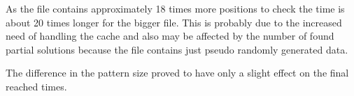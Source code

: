 As the file contains approximately 18 times more positions to check the time is about 20 times longer for the bigger file. This is probably due to the increased need of handling the cache and also may be affected by the number of found partial solutions because the file contains just pseudo randomly generated data.

The difference in the pattern size proved to have only a slight effect on the final reached times.

\begin{figure}
\begin{minipage}{\linewidth}
\centering
{}
\end{minipage}\par\medskip

\begin{minipage}{.5\linewidth}
\centering
{}
\end{minipage}%
\begin{minipage}{.5\linewidth}
\centering
{}
\end{minipage}\par\medskip


\end{figure}
